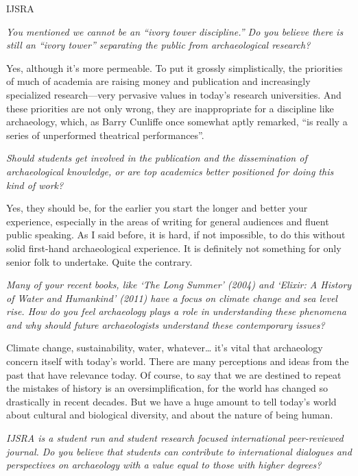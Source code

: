 \begin{labeling}{IJSRA}
\item[IJSRA] \emph{You mentioned we cannot be an “ivory tower discipline.” Do you believe there is still an “ivory tower” separating the public from archaeological research?}

\item[BMF] Yes, although it’s more permeable. To put it grossly simplistically, the priorities of much of academia are raising money and publication and increasingly specialized research—very pervasive values in today’s research universities. And these priorities are not only wrong, they are inappropriate for a discipline like archaeology, which, as Barry Cunliffe once somewhat aptly remarked, “is really a series of unperformed theatrical performances”.

\item[IJSRA] \emph{Should students get involved in the publication and the dissemination of archaeological knowledge, or are top academics better positioned for doing this kind of work?}

\item[BMF] Yes, they should be, for the earlier you start the longer and better your experience, especially in the areas of writing for general audiences and fluent public speaking. As I said before, it is hard, if not impossible, to do this without solid first-hand archaeological experience. It is definitely not something for only senior folk to undertake. Quite the contrary.
	
\item[IJSRA] \emph{Many of your recent books, like \emph{‘The Long Summer’} (2004) and \emph{‘Elixir: A History of Water and Humankind’} (2011) have a focus on climate change and sea level rise. How do you feel archaeology plays a role in understanding these phenomena and why should future archaeologists understand these contemporary issues?}
                
\item[BMF] Climate change, sustainability, water, whatever… it’s vital that archaeology concern itself with today’s world. There are many perceptions and ideas from the past that have relevance today. Of course, to say that we are destined to repeat the mistakes of history is an oversimplification, for the world has changed so drastically in recent decades. But we have a huge amount to tell today’s world about cultural and biological diversity, and about the nature of being human.

\item[IJSRA] \emph{IJSRA is a student run and student research focused international peer-reviewed journal. Do you believe that students can contribute to international dialogues and perspectives on archaeology with a value equal to those with higher degrees?}


\end{labeling}
